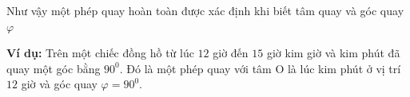 \documentclass[12pt,oneside,a4paper,reqno]{book}
\begin{document}
Như vậy một phép quay hoàn toàn được xác định khi biết tâm quay và góc quay $\varphi$

\textbf{Ví dụ:} Trên một chiếc đồng hồ từ lúc $12$ giờ đến $15$ giờ kim giờ và kim phút đã quay một góc bằng $90^0$. Đó là một phép quay với tâm O là lúc kim phút  ở vị trí $12$ giờ và góc quay $\varphi=90^0$.


%	
\newpage



 
 
  
 
\end{document}
